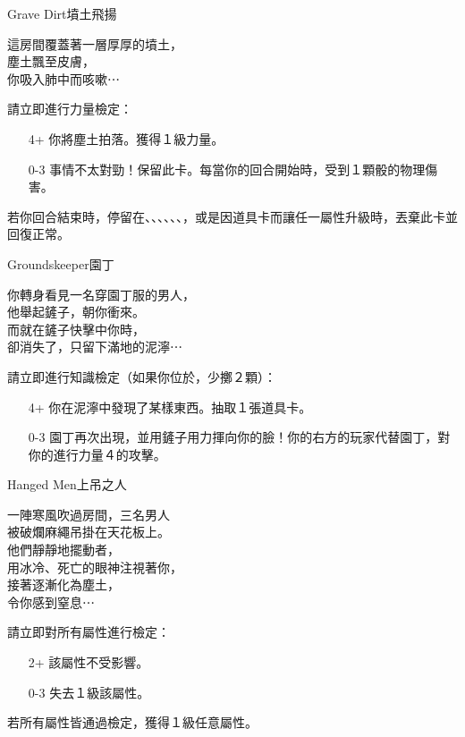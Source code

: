 %
\begin{EventCard}{Grave Dirt}{墳土飛揚}

  \begin{CardStory}
    這房間覆蓋著一層厚厚的墳土，\\
    塵土飄至皮膚，\\
    你吸入肺中而咳嗽⋯
  \end{CardStory}

  請立即進行力量檢定：
  \begin{itemize}
    \item[4+] 你將塵土拍落。獲得１級力量。
    \item[0-3] 事情不太對勁！保留此卡。每當你的回合開始時，受到１顆骰的物理傷害。
  \end{itemize}
  若你回合結束時，停留在、、、、、、，或是因道具卡而讓任一屬性升級時，丟棄此卡並回復正常。\\[0.5em]

\end{EventCard}%
%
\begin{EventCard}{Groundskeeper}{園丁}

  \begin{CardStory}
    你轉身看見一名穿園丁服的男人，\\
    他舉起鏟子，朝你衝來。\\
    而就在鏟子快擊中你時，\\
    卻消失了，只留下滿地的泥濘⋯
  \end{CardStory}

  請立即進行知識檢定（如果你位於，少擲２顆）：
  \begin{itemize}
    \item[4+] 你在泥濘中發現了某樣東西。抽取１張道具卡。
    \item[0-3] 園丁再次出現，並用鏟子用力揮向你的臉！你的右方的玩家代替園丁，對你的進行力量４的攻擊。
  \end{itemize}

\end{EventCard}%
%
\begin{EventCard}{Hanged Men}{上吊之人}

  \begin{CardStory}
    一陣寒風吹過房間，三名男人\\
    被破爛麻繩吊掛在天花板上。\\
    他們靜靜地擺動者，\\
    用冰冷、死亡的眼神注視著你，\\
    接著逐漸化為塵土，\\
    令你感到窒息⋯
  \end{CardStory}

  請立即對所有屬性進行檢定：
  \begin{itemize}
    \item[2+] 該屬性不受影響。
    \item[0-3] 失去１級該屬性。
  \end{itemize}
  若所有屬性皆通過檢定，獲得１級任意屬性。\\[0.5em]

\end{EventCard}%

